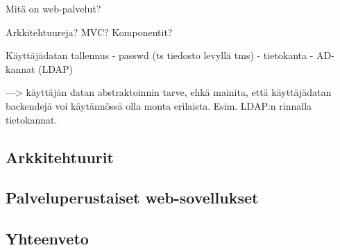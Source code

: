 Mitä on web-palvelut?

Arkkitehtuureja? MVC? Komponentit?

Käyttäjädatan tallennus
- passwd (ts tiedosto levyllä tms)
- tietokanta
- AD-kannat (LDAP)

---> käyttäjän datan abstraktoinnin tarve, ehkä mainita, että käyttäjädatan backendejä voi käytännössä olla monta erilaista. Esim. LDAP:n rinnalla tietokannat.


\subsection{Arkkitehtuurit}

\subsection{Palveluperustaiset web-sovellukset}

\subsection{Yhteenveto}

